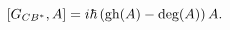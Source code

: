 \begin{equation}
\lbrack G_{CB^{\ast}},A]=i\hbar\left(\hbox{gh}(A)-\hbox{deg}(A)\right)A.
\label{3.19}%
\end{equation}

